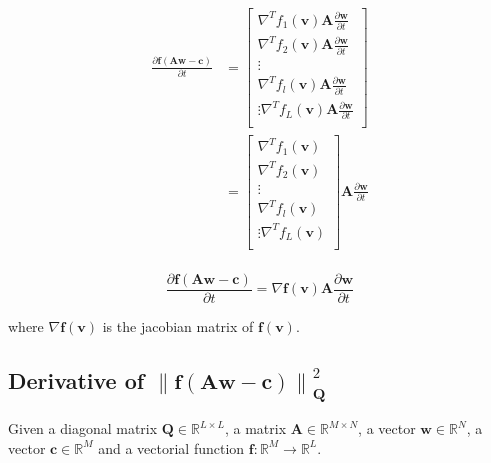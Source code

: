 \begin{align}
\frac{\partial \mathbf{f}\left(\mathbf{A}\mathbf{w}-\mathbf{c}\right)}{\partial t}
&=
\begin{bmatrix}
\nabla^{T} f_{1}\left(\mathbf{v}\right)
\mathbf{A}\frac{\partial \mathbf{w}}{\partial t}\\[4pt]
\nabla^{T} f_{2}\left(\mathbf{v}\right)
\mathbf{A}\frac{\partial \mathbf{w}}{\partial t}\\[4pt]
\vdots\\[4pt]
\nabla^{T} f_{l}\left(\mathbf{v}\right)
\mathbf{A}\frac{\partial \mathbf{w}}{\partial t}\\[4pt]
\vdots
\nabla^{T} f_{L}\left(\mathbf{v}\right)
\mathbf{A}\frac{\partial \mathbf{w}}{\partial t}\\[4pt]
\end{bmatrix}\\
&=
\begin{bmatrix}
\nabla^{T} f_{1}\left(\mathbf{v}\right)\\[4pt]
\nabla^{T} f_{2}\left(\mathbf{v}\right)\\[4pt]
\vdots\\[4pt]
\nabla^{T} f_{l}\left(\mathbf{v}\right)\\[4pt]
\vdots
\nabla^{T} f_{L}\left(\mathbf{v}\right)\\[4pt]
\end{bmatrix}
\mathbf{A}\frac{\partial \mathbf{w}}{\partial t}\\
\end{align}

\begin{equation}
\label{eq:DfAwc}
\frac{\partial \mathbf{f}\left(\mathbf{A}\mathbf{w}-\mathbf{c}\right)}{\partial t}
=
\nabla \mathbf{f}(\mathbf{v})
\mathbf{A}\frac{\partial \mathbf{w}}{\partial t}
\end{equation}

where $\nabla \mathbf{f}(\mathbf{v})$ is the jacobian matrix of $\mathbf{f}(\mathbf{v})$. 

\subsection{Derivative of $\left\|\mathbf{f}\left(\mathbf{A}\mathbf{w}-\mathbf{c}\right)\right\|_{\mathbf{Q}}^2$}

Given a diagonal matrix $\mathbf{Q} \in \mathbb{R}^{L\times L}$,
a matrix $\mathbf{A} \in \mathbb{R}^{M\times N}$,
a vector $\mathbf{w} \in \mathbb{R}^{N}$,
a vector $\mathbf{c} \in \mathbb{R}^{M}$ and 
a vectorial function $\mathbf{f}:\mathbb{R}^{M} \to \mathbb{R}^{L}$.

